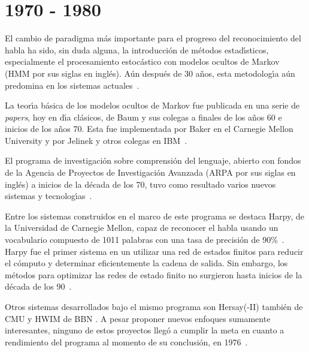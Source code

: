 \section{1970 - 1980}
\label{sec:70s}

El cambio de paradigma m\'as importante para el progreso del reconocimiento del habla ha sido, sin duda alguna,
la introducci\'on de m\'etodos estad{\'\i}sticos, especialmente el procesamiento estoc\'astico con modelos ocultos de
Markov (HMM por sus siglas en ingl\'es). A\'un despu\'es de 30 a\~nos, esta metodolog{\'\i}a a\'un predomina en los
sistemas \mbox{actuales \cite{BakerResearch2009}}.

La teor{\'\i}a b\'asica de los modelos ocultos de Markov fue publicada en una serie de \emph{papers}, 
hoy en d{\'\i}a cl\'asicos, de Baum y sus colegas a finales de los a\~nos 60 e inicios de los a\~nos 70. 
Esta fue implementada por Baker en el Carnegie Mellon University y por Jelinek y otros colegas en 
\mbox{IBM \cite{Rabiner89atutorial}}.

El programa de investigaci\'on sobre comprensi\'on del lenguaje, abierto con fondos de la Agencia de Proyectos de Investigaci\'on Avanzada (ARPA por sus siglas en ingl\'es) a inicios de la d\'ecada de los 70, tuvo como 
resultado varios nuevos sistemas y \mbox{tecnolog{\'\i}as \cite{Furui50Years2004}}.

Entre los sistemas construidos en el marco de este programa se destaca Harpy, de la Universidad de Carnegie Mellon,
capaz de reconocer el habla usando un vocabulario compuesto de 1011 palabras con una tasa de 
precisi\'on de \mbox{90\% \cite{Newell1978}.} Harpy fue el primer sistema en un utilizar una red de estados finitos
para reducir el c\'omputo y determinar eficientemente la cadena de salida. 
Sin embargo, los m\'etodos para optimizar las redes de estado finito no surgieron hasta inicios de
la d\'ecada de los \mbox{90 \cite{JuangAutomaticSpeech}}.

Otros sistemas desarrollados bajo el mismo programa son Hersay(-II) tambi\'en de CMU y HWIM 
de BBN \cite{JuangAutomaticSpeech}. A pesar proponer nuevos enfoques sumamente interesantes, 
ninguno de estos proyectos lleg\'o a cumplir la meta en cuanto a rendimiento
del programa al momento de su conclusi\'on, en \mbox{1976 \cite{JuangAutomaticSpeech}}.